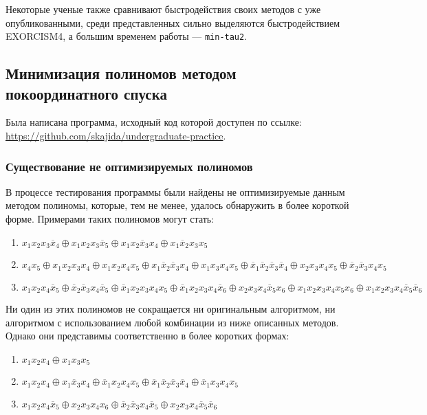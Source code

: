 \documentclass[a4paper,12pt,titlepage,finall]{article}
\begin{document}
Некоторые ученые также сравнивают быстродействия своих методов с уже опубликованными, среди представленных сильно выделяются быстродействием \textsc{EXORCISM4}, а большим временем работы --- \texttt{min-tau2}.

\subsection{Минимизация полиномов методом покоординатного спуска}

Была написана программа, исходный код которой доступен по ссылке: \url{https://github.com/skajida/undergraduate-practice}.

\subsubsection{Существование не оптимизируемых полиномов}

В процессе тестирования программы были найдены не оптимизируемые данным методом полиномы, которые, тем не менее, удалось обнаружить в более короткой форме. Примерами таких полиномов могут стать:
\begin{enumerate}
    \item $ x_1 x_2 x_3 \overline x_4 \oplus x_1 x_2 x_3 \overline x_5 \oplus x_1 x_2 \overline x_3 x_4 \oplus x_1 \overline x_2 x_3 x_5 $
    \item $ x_4 x_5 \oplus x_1 x_2 x_3 x_4 \oplus x_1 x_2 x_4 x_5 \oplus x_1 \overline x_2 \overline x_3 x_4 \oplus x_1 x_3 x_4 x_5 \oplus \overline x_1 \overline x_2 \overline x_3 \overline x_4 \oplus x_2 x_3 x_4 x_5 \oplus \overline x_2 \overline x_3 x_4 x_5 $
    \item $ x_1 x_2 x_4 \overline x_5 \oplus \overline x_2 \overline x_3 x_4 \overline x_5 \oplus \overline x_1 x_2 x_3 x_4 x_5 \oplus \overline x_1 x_2 x_3 x_4 \overline x_6 \oplus x_2 x_3 x_4 \overline x_5 x_6 \oplus x_1 x_2 x_3 x_4 x_5 x_6 \oplus x_1 x_2 x_3 x_4 \overline x_5 \overline x_6 $
\end{enumerate}

Ни один из этих полиномов не сокращается ни оригинальным алгоритмом, ни алгоритмом с использованием любой комбинации из ниже описанных методов. Однако они представимы соответственно в более коротких формах:
\begin{enumerate}
    \item $ x_1 x_2 x_4 \oplus x_1 x_3 x_5 $
    \item $ x_1 x_2 x_4 \oplus x_1 \overline x_3 x_4 \oplus \overline x_1 x_2 x_4 x_5 \oplus \overline x_1 \overline x_2 \overline x_3 \overline x_4 \oplus \overline x_1 x_3 x_4 x_5 $
    \item $ x_1 x_2 x_4 \overline x_5 \oplus x_2 x_3 x_4 x_6 \oplus \overline x_2 \overline x_3 x_4 \overline x_5 \oplus x_2 x_3 x_4 \overline x_5 \overline x_6 $
\end{enumerate}
\end{document}
